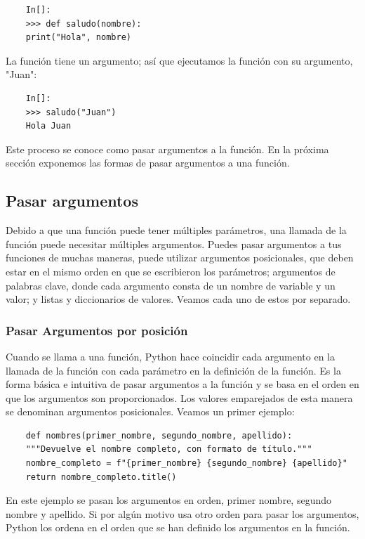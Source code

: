 \begin{lstlisting}
	In[]:	
	>>> def saludo(nombre):
	print("Hola", nombre)
\end{lstlisting}
La función tiene un argumento; así que ejecutamos la función con su argumento, {\ttfamily {}"{}Juan{}"{}}:
\begin{lstlisting}
	In[]:
	>>> saludo("Juan")
	Hola Juan
\end{lstlisting}

Este proceso se conoce como pasar argumentos a la función. En la próxima sección exponemos las formas de pasar argumentos a una función.


\subsection{Pasar argumentos}


Debido a que una función puede tener múltiples parámetros, una llamada de la función puede necesitar múltiples argumentos. 
Puedes pasar argumentos a tus funciones de muchas maneras, puede utilizar argumentos posicionales, que deben estar
en el mismo orden en que se escribieron los parámetros; argumentos de palabras clave, donde cada argumento consta de un nombre de variable y un valor; y listas y diccionarios de valores. Veamos cada uno de estos por separado.

\subsubsection{Pasar Argumentos por posición}

Cuando se llama a una función, Python hace coincidir cada argumento en la llamada de la función con cada  parámetro en la definición de la función.  Es la forma básica e intuitiva de pasar argumentos a la función y se basa en el orden en que los argumentos son proporcionados. Los valores emparejados de esta manera se denominan argumentos posicionales. Veamos un primer ejemplo:

\hspace{-2.3cm}{\ttfamily \scriptsize nombres.py}\vspace{-0.5cm}
\begin{lstlisting}
	def nombres(primer_nombre, segundo_nombre, apellido):
	"""Devuelve el nombre completo, con formato de título."""
	nombre_completo = f"{primer_nombre} {segundo_nombre} {apellido}"
	return nombre_completo.title()
\end{lstlisting}\label{arg_opcional}

En este ejemplo se pasan los argumentos en orden, primer nombre, segundo nombre y apellido. Si por 
algún motivo usa otro orden para pasar los argumentos, Python los ordena en el orden que se
han definido los argumentos en la función.\vspace{0.08cm}

